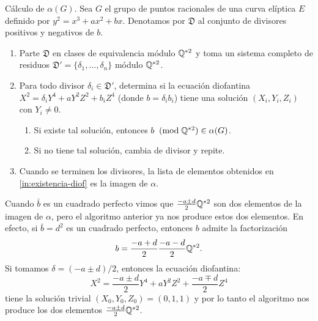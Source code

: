 \documentclass[../../tesis_maestria]{subfiles}
\begin{document}
\begin{alg}\label{alg:puntos-racionales}
Cálculo de $\alpha(G)$. Sea $G$ el grupo de puntos racionales de una curva elíptica $E$ definido por $y^2=x^3+ax^2+bx$. Denotamos por $\mathfrak{D}$ al conjunto de divisores positivos y negativos de $b$.
\begin{enumerate}
	\item Parte $\mathfrak{D}$ en clases de equivalencia módulo $\mathbb{Q}^{*2}$ y toma un sistema completo de residuos $\mathfrak{D}'=\{\delta_1,\ldots,\delta_n\}$ módulo $\mathbb{Q}^{*2}$.
	\item Para todo divisor $\delta_i\in\mathfrak{D}'$, determina si la ecuación diofantina $X^2=\delta_i Y^4+aY^2Z^2+b_i Z^4$ (donde $b=\delta_i b_i$) tiene una solución $(X_i,Y_i,Z_i)$ con $Y_i\neq0$.
	\begin{enumerate} 
		\item\label{in:existencia-diof} Si existe tal solución, entonces $b\;\;(\mathrm{mod}\; \mathbb{Q}^{*2})\in\alpha(G)$.
		\item Si no tiene tal solución, cambia de divisor y repite.
	\end{enumerate}
	\item Cuando se terminen los divisores, la lista de elementos obtenidos en \ref{in:existencia-diof} es la imagen de $\alpha$.
\end{enumerate}
\end{alg}

\begin{nota}
	Cuando $\bar{b}$ es un cuadrado perfecto vimos que $\frac{-a\pm d}{2}\mathbb{Q}^{*2}$ son dos elementos de la imagen de $\alpha$, pero el algoritmo anterior ya nos produce estos dos elementos. En efecto, si $\bar{b}=d^2$ es un cuadrado perfecto, entonces $b$ admite la factorización
	\[
		b=\frac{-a+d}{2}\frac{-a-d}{2}\mathbb{Q}^{*2}.
	\]
	Si tomamos $\delta=(-a\pm d)/2$, entonces la ecuación diofantina:
	\[
		X^2=\frac{-a\pm d}{2} Y^4+aY^2Z^2+\frac{-a\mp d}{2}Z^4
	\]
	tiene la solución trivial $(X_0,Y_0,Z_0)=(0,1,1)$ y por lo tanto el algoritmo nos produce los dos elementos $\frac{-a\pm d}{2}\mathbb{Q}^{*2}$.
\end{nota}
\end{document}
